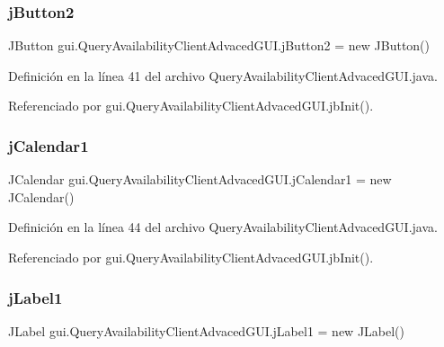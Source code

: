 \subsubsection{\texorpdfstring{jButton2}{jButton2}}
{\footnotesize\ttfamily J\+Button gui.\+Query\+Availability\+Client\+Advaced\+G\+U\+I.\+j\+Button2 = new J\+Button()\hspace{0.3cm}{\ttfamily [private]}}



Definición en la línea 41 del archivo Query\+Availability\+Client\+Advaced\+G\+U\+I.\+java.



Referenciado por gui.\+Query\+Availability\+Client\+Advaced\+G\+U\+I.\+jb\+Init().

\mbox{\label{classgui_1_1_query_availability_client_advaced_g_u_i_a6ff456ec71a8288c4866eb308477fef9}} 
\subsubsection{\texorpdfstring{jCalendar1}{jCalendar1}}
{\footnotesize\ttfamily J\+Calendar gui.\+Query\+Availability\+Client\+Advaced\+G\+U\+I.\+j\+Calendar1 = new J\+Calendar()\hspace{0.3cm}{\ttfamily [private]}}



Definición en la línea 44 del archivo Query\+Availability\+Client\+Advaced\+G\+U\+I.\+java.



Referenciado por gui.\+Query\+Availability\+Client\+Advaced\+G\+U\+I.\+jb\+Init().

\mbox{\label{classgui_1_1_query_availability_client_advaced_g_u_i_a608d95691de8bd9b5faeb17a483ea525}} 
\subsubsection{\texorpdfstring{jLabel1}{jLabel1}}
{\footnotesize\ttfamily J\+Label gui.\+Query\+Availability\+Client\+Advaced\+G\+U\+I.\+j\+Label1 = new J\+Label()\hspace{0.3cm}{\ttfamily [private]}}



